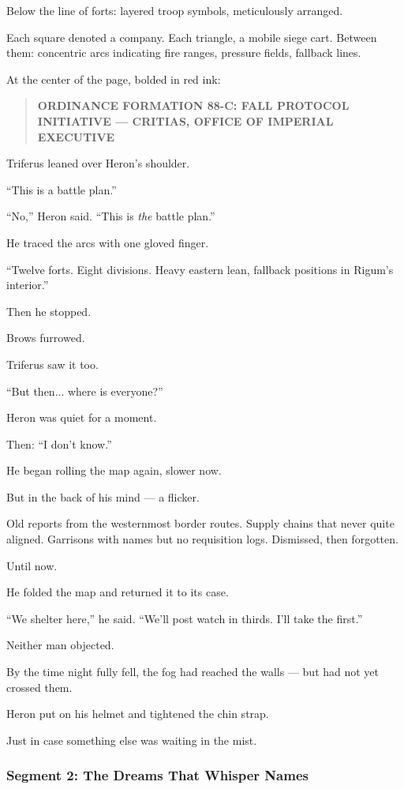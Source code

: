 \documentclass[9pt]{article}
\begin{document}
Below the line of forts: layered troop symbols, meticulously arranged.

Each square denoted a company. Each triangle, a mobile siege cart. Between them: concentric arcs indicating fire ranges, pressure fields, fallback lines.

At the center of the page, bolded in red ink:

\begin{quote}
\textbf{ORDINANCE FORMATION 88-C: FALL PROTOCOL INITIATIVE — CRITIAS, OFFICE OF IMPERIAL EXECUTIVE}
\end{quote}

Triferus leaned over Heron’s shoulder.

“This is a battle plan.”

“No,” Heron said. “This is \textit{the} battle plan.”

He traced the arcs with one gloved finger.

“Twelve forts. Eight divisions. Heavy eastern lean, fallback positions in Rigum’s interior.”

Then he stopped.

Brows furrowed.

Triferus saw it too.

“But then... where is everyone?”

Heron was quiet for a moment.

Then: “I don’t know.”

He began rolling the map again, slower now.

But in the back of his mind — a flicker.

Old reports from the westernmost border routes. Supply chains that never quite aligned. Garrisons with names but no requisition logs. Dismissed, then forgotten.

Until now.

He folded the map and returned it to its case.

“We shelter here,” he said. “We’ll post watch in thirds. I’ll take the first.”

Neither man objected.

By the time night fully fell, the fog had reached the walls — but had not yet crossed them.

Heron put on his helmet and tightened the chin strap.

Just in case something else was waiting in the mist.

\newpage

\subsubsection*{Segment 2: The Dreams That Whisper Names}
\end{document}
